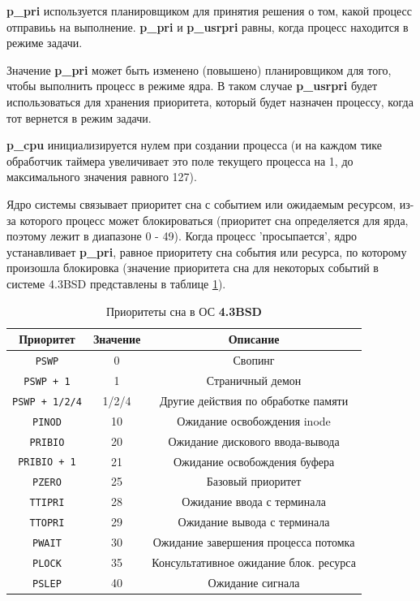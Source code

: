 \textbf{p\_pri} используется планировщиком для принятия решения о том, какой процесс отправиьь на выполнение. \textbf{p\_pri} и \textbf{p\_usrpri} равны, когда процесс находится в режиме задачи. 

Значение \textbf{p\_pri} может быть изменено (повышено) планировщиком для того, чтобы выполнить процесс в режиме ядра. В таком случае \textbf{p\_usrpri} будет использоваться для хранения приоритета, который будет назначен процессу, когда тот вернется в режим задачи.

\textbf{p\_cpu} инициализируется нулем при создании процесса (и на каждом тике обработчик таймера увеличивает это поле текущего процесса на 1, до максимального значения равного 127).

Ядро системы связывает приоритет сна с событием или ожидаемым ресурсом, из-за которого процесс может блокироваться (приоритет сна определяется для ярда, поэтому лежит в диапазоне 0 - 49). Когда процесс 'просыпается', ядро устанавливает \textbf{p\_pri}, равное приоритету сна события или ресурса, по которому произошла блокировка (значение приоритета сна для некоторых событий в системе 4.3BSD представлены в таблице \ref{tab:bsd}).


\begin{table}[h!]
	\caption{Приоритеты
		сна в ОС \textbf{4.3BSD}}
	\label{tab:bsd}
	\begin{center}
		\begin{tabular}{ |c|c|c|  }
			\hline
			\textbf{Приоритет} & \textbf{Значение} & \textbf{Описание} \\
			\hline
			\texttt{PSWP} & 0 & Свопинг \\
			\hline
			\texttt{PSWP + 1} & 1 & Страничный демон \\
			\hline
			\texttt{PSWP + 1/2/4} & 1/2/4 & Другие действия по обработке памяти \\
			\hline
			\texttt{PINOD} & 10 & Ожидание освобождения inode \\
			\hline
			\texttt{PRIBIO} & 20 & Ожидание дискового ввода-вывода \\
			\hline
			\texttt{PRIBIO + 1} & 21 & Ожидание освобождения буфера \\
			\hline
			\texttt{PZERO} & 25 & Базовый приоритет \\
			\hline
			\texttt{TTIPRI} & 28 & Ожидание ввода с терминала \\
			\hline
			\texttt{TTOPRI} & 29 & Ожидание вывода с терминала \\
			\hline 
			\texttt{PWAIT} & 30 & Ожидание завершения процесса потомка \\
			\hline
			\texttt{PLOCK} & 35 & Консультативное ожидание блок. ресурса \\
			\hline
			\texttt{PSLEP} & 40 & Ожидание сигнала \\
			\hline
		\end{tabular}
	\end{center}
\end{table}

